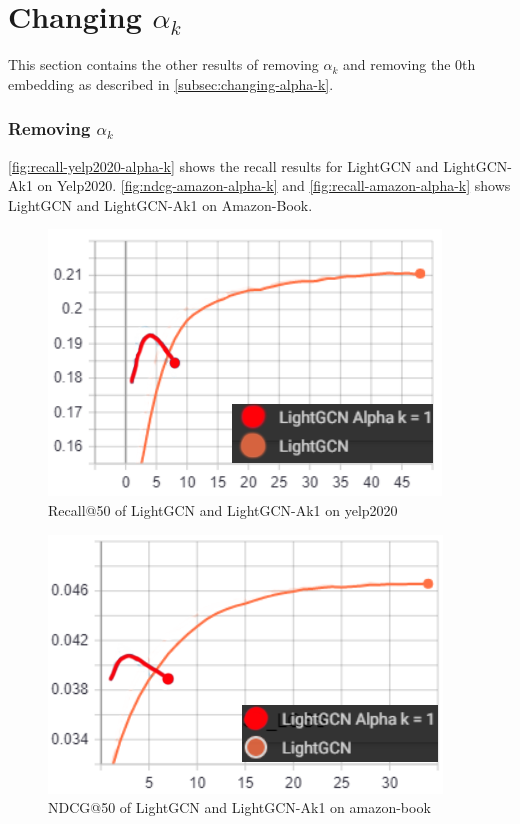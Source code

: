 \section{Changing $\alpha_k$}
This section contains the other results of removing $\alpha_k$ and removing the 0th embedding as described in \autoref{subsec:changing-alpha-k}.

\subsubsection{Removing $\alpha_k$}\label{app:removing-alpha-k}
\autoref{fig:recall-yelp2020-alpha-k} shows the recall results for LightGCN and LightGCN-Ak1 on Yelp2020.
\autoref{fig:ndcg-amazon-alpha-k} and \autoref{fig:recall-amazon-alpha-k} shows LightGCN and LightGCN-Ak1 on Amazon-Book.
\begin{figure}[h!]
    \includegraphics[width=\linewidth]{figures/alpha-k-results/yelp2020-recall.png}
    \caption{Recall@50 of LightGCN and LightGCN-Ak1 on yelp2020}
    \label{fig:recall-yelp2020-alpha-k}
\end{figure}
\begin{figure}[h!]
    \includegraphics[width=\linewidth]{figures/alpha-k-results/amazon-ndcg.png}
    \caption{NDCG@50 of LightGCN and LightGCN-Ak1 on amazon-book}
    \label{fig:ndcg-amazon-alpha-k}
\end{figure}
